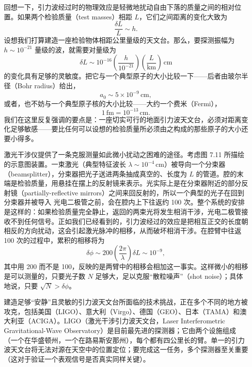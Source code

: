 回想一下，引力波经过时的物理效应是轻微地扰动自由下落的质量之间的相对位置。如果两个检验质量（test masses）相距 $L$，它们之间距离的变化大致为
\begin{equation*}
\frac{\delta L}{L} \sim h.
\tag{7.198}
\end{equation*}
设想我们打算建造一座检验物体相距公里量级的天文台。那么，要探测振幅为
$h\sim 10^{-21}$ 量级的波，就需要对量级为
\begin{equation*}
\delta L \sim 10^{-16}\left(\frac{h}{10^{-21}}\right)\left(\frac{L}{\mathrm{km}}\right)\,\mathrm{cm}
\tag{7.199}
\end{equation*}
的变化具有足够的灵敏度。把它与一个典型原子的大小比较一下——后者由玻尔半径（Bohr radius）给出，
\begin{equation*}
a_0 \sim 5\times 10^{-9}\,\mathrm{cm},
\tag{7.200}
\end{equation*}
或者，也不妨与一个典型原子核的大小比较——大约一个费米（Fermi），
\begin{equation*}
1\,\mathrm{fm} = 10^{-13}\,\mathrm{cm}.
\tag{7.201}
\end{equation*}
我们在这里反复强调的要点是：一座切实可行的地面引力波天文台，必须对距离变化足够敏感——要比任何可以设想的检验质量所必须由之构成的那些原子的大小还要小得多。


激光干涉仪提供了一条克服测量如此微小扰动之困难的途径。考虑图 7.11 所描绘的示意图装置。一束激光（典型特征波长 $\lambda \sim 10^{-4}\,\mathrm{cm}$）被导向一个分束器（beamsplitter），分束器把光子送进两条抽成真空的、长度为 $L$ 的管道。腔的末端是检验质量，用悬挂在摆上的反射镜来表示。光实际上是在分束器附近的部分反射镜（partially-reflective mirrors）之间来回反射的，所以一个典型的光子在回到分束器并被导入
光电二极管之前，会在腔内上下往返约 100 次。整个系统的安排是这样的：如果检验质量完全静止，返回的两束光将发生相消干涉，光电二极管接收不到任何信号。正如我们已经看到的，引力波经过的效应是把相互正交的长度朝相反的方向扰动，这会引起激光脉冲的相移，从而破坏相消干涉。在腔臂中往返 100 次的过程中，累积的相移将为
\begin{equation*}
\delta\phi \sim 200\left(\frac{2\pi}{\lambda}\right)\delta L \sim 10^{-9},
\tag{7.202}
\end{equation*}
其中用 200 而不是 100，反映的是两臂中的相移会相加这一事实。这样微小的相移是可以测量的，只要光子数 $N$ 足够大，足以克服“散粒噪声”（shot noise）；具体地说，只要 $\sqrt{N} > \delta\phi$。

建造足够“安静”且灵敏的引力波天文台所面临的技术挑战，正在多个不同的地方被攻克，包括美国（LIGO）、意大利（Virgo）、德国（GEO）、日本（TAMA）和澳大利亚（ACIGA）。LIGO（激光干涉引力波天文台，Laser Interferometric Gravitational-Wave Observatory）是目前最先进的探测器；它由两个设施组成（一个在华盛顿州，一个在路易斯安那州），每个都有四公里长的臂。单一的引力波天文台将无法对源在天空中的位置定位；要完成这一任务，多个探测器至关重要（这对于验证一个表观信号是否真实同样关键）。

